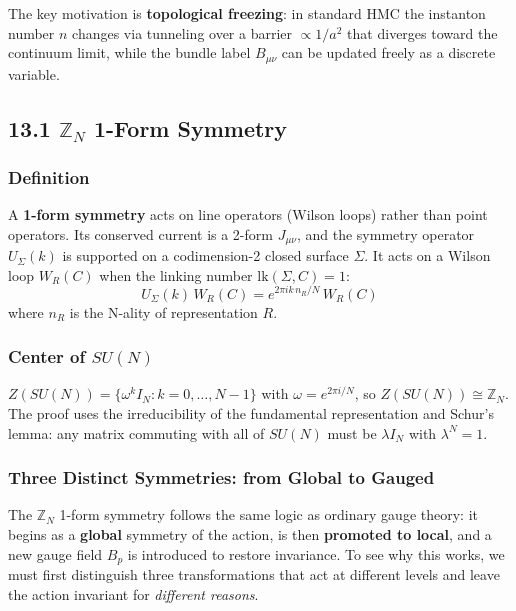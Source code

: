 \documentclass[12pt,a4paper]{article}
\begin{document}
The key motivation is \textbf{topological freezing}: in standard HMC the instanton number $n$ changes via tunneling over a barrier $\propto 1/a^2$ that diverges toward the continuum limit, while the bundle label $B_{\mu\nu}$ can be updated freely as a discrete variable.

\subsection*{13.1 $\mathbb{Z}_N$ 1-Form Symmetry}

\subsubsection*{Definition}

A \textbf{1-form symmetry} acts on line operators (Wilson loops) rather than point operators.
Its conserved current is a 2-form $J_{\mu\nu}$, and the symmetry operator $U_\Sigma(k)$
is supported on a codimension-2 closed surface $\Sigma$.
It acts on a Wilson loop $W_R(C)$ when the linking number $\mathrm{lk}(\Sigma,C)=1$:
\begin{equation}
  U_\Sigma(k)\,W_R(C) = e^{2\pi i k\, n_R/N}\,W_R(C)
\end{equation}
where $n_R$ is the N-ality of representation $R$.

\subsubsection*{Center of $SU(N)$}

$Z(SU(N)) = \{\omega^k I_N : k=0,\ldots,N{-}1\}$ with $\omega = e^{2\pi i/N}$,
so $Z(SU(N))\cong\mathbb{Z}_N$.
The proof uses the irreducibility of the fundamental representation and Schur's lemma:
any matrix commuting with all of $SU(N)$ must be $\lambda I_N$ with $\lambda^N=1$.

\subsubsection*{Three Distinct Symmetries: from Global to Gauged}

The $\mathbb{Z}_N$ 1-form symmetry follows the same logic as ordinary gauge theory:
it begins as a \textbf{global} symmetry of the action, is then \textbf{promoted to local},
and a new gauge field $B_p$ is introduced to restore invariance.
To see why this works, we must first distinguish three transformations
that act at different levels and leave the action invariant for \emph{different reasons}.
\end{document}
